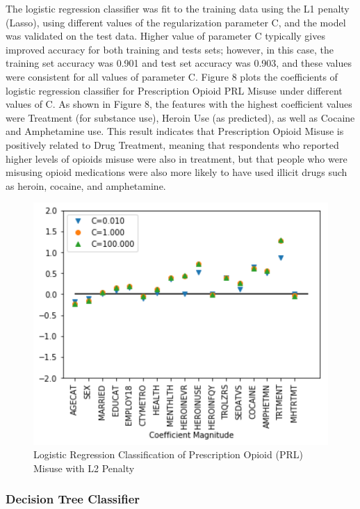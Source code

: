 \documentclass[sigconf]{acmart}
\begin{document}
The logistic regression classifier was fit to the training data using the 
L1 penalty (Lasso), using different values of the regularization parameter C,
and the model was validated on the test data. Higher value of parameter C 
typically gives improved accuracy for both training and tests sets; however, 
in this case, the training set accuracy was 0.901 and test set accuracy was 
0.903, and these values were consistent for all values of parameter C. 
Figure 8 plots the coefficients of logistic regression classifier for 
Prescription Opioid PRL Misuse under different values of C. As shown in 
Figure 8, the features with the highest coefficient values were Treatment
(for substance use), Heroin Use (as predicted), as well as Cocaine and 
Amphetamine use. This result indicates that Prescription Opioid Misuse is 
positively related to Drug Treatment, meaning that respondents who reported
higher levels of opioids misuse were also in treatment, but that people 
who were misusing opioid medications were also more likely to have used
illicit drugs such as heroin, cocaine, and amphetamine. 

\begin{figure}[!ht]
  \centering\includegraphics[width=\columnwidth]{images/Figure8.pdf}
  \caption{Logistic Regression Classification of Prescription Opioid 
  (PRL) Misuse
  with L2 Penalty}
  \label{f:Figure8}
\end{figure}


\subsubsection{Decision Tree Classifier}
\end{document}
